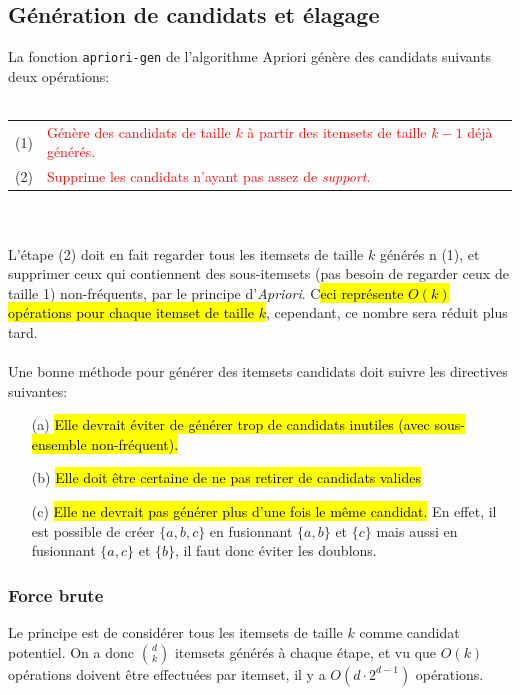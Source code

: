\documentclass[letterpaper, 12pt]{article}
\newcommand{\alinea}{
\hspace*{0.5cm}}
\newcommand{\red}[1]{
	\textcolor{red}{#1}}
\newcommand{\myul}[1]{
		\underline{\smash{#1}}
	}
\begin{document}
		\subsection{Génération de candidats et élagage}\label{sec:apriori:gen}
			\alinea La fonction \texttt{apriori-gen} de l'algorithme Apriori
				génère des candidats suivants deux opérations:\\~\\
				\begin{tabular}{lp{12cm}}
					(1) \myul{\textbf{\hl{Génération de candidat}}} & 
						\red{Génère des candidats de taille $k$ à partir 
							des itemsets de taille $k-1$ déjà générés.}\\
					(2) \myul{\textbf{\hl{\'Elagage des candidats}}} & 
						\red{Supprime les candidats n'ayant pas assez de
						\textit{support}.}
				\end{tabular}~\\~\\
			\alinea L'étape (2) doit en fait regarder tous les itemsets de
				taille $k$ générés n (1), et supprimer ceux qui contiennent
				des sous-itemsets (pas besoin de regarder ceux de taille 1)
				non-fréquents, par le principe d'\textit{Apriori}. C\hl{eci
				représente $O(k)$ opérations pour chaque itemset de
				taille $k$}, cependant, ce nombre sera réduit plus tard.\\
			~\\
			\alinea Une bonne méthode pour générer des itemsets candidats doit
				suivre les directives suivantes:
				\begin{enumerate}
					\setlength{\itemsep}{0pt}
					\setlength{\parskip}{0pt}
					\setlength{\parsep}{0pt}
					\item[(a)] \hl{Elle devrait éviter de générer trop de 
						candidats inutiles (avec sous-ensemble non-fréquent).}
					\item[(b)] \hl{Elle doit être certaine de ne pas retirer
						de candidats valides}
					\item[(c)] \hl{Elle ne devrait pas générer plus d'une fois
						le même candidat.} En effet, il est possible de
						créer $\{a,b,c\}$ en fusionnant $\{a, b\}$ et $\{c\}$
						mais aussi en fusionnant $\{a, c\}$ et $\{b\}$, il
						faut donc éviter les doublons.
				\end{enumerate}
			\subsubsection{Force brute}
				\alinea Le principe est de considérer tous les itemsets
					de taille $k$ comme candidat potentiel. On a donc
					$\binom{d}{k}$ itemsets générés à chaque étape,
					et vu que $O(k)$ opérations doivent être effectuées par
					itemset, il y a $O(d\cdot 2^{d-1})$ opérations.
\end{document}
